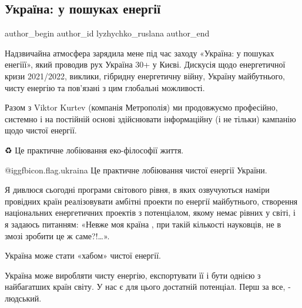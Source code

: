  
 
 
 
 
 
\subsection{Україна: у пошуках енергії}
\label{sec:27_01_2022.fb.lyzhychko_ruslana.1.ukraina_u_poshukah_energii}
 
\ifcmt
 author_begin
   author_id lyzhychko_ruslana
 author_end
\fi

Надзвичайна атмосфера зарядила мене під час заходу «Україна: у пошуках
енегіїї», який проводив рух Україна 30+ у Києві. Дискусія щодо енергетичної
кризи 2021/2022, виклики, гібридну енергетичну війну, Україну майбутнього,
чисту енергію та пов'язані з цим глобальні можливості. 


Разом з Viktor  Kurtev (компанія Метрополія) ми продовжуємо професійно,
системно і на постійній основі здійснювати інформаційну (і не тільки) кампанію
щодо чистої енергії.


♻️ Це практичне лобіювання еко-філософії життя. 

@igg{fbicon.flag.ukraina} Це практичне лобіювання чистої енергії України. 

Я дивлюся сьогодні програми світового рівня, в яких озвучуються наміри
провідних країн реалізовувати амбітні проекти по енергії майбутнього,
створення національних енергетичних проектів з потенціалом, якому немає рівних
у світі, і я задаюсь питанням:  «Невже моя країна , при такій кількості
науковців, не в змозі зробити це ж саме?!…». 

Україна може стати «хабом» чистої енергії.

Україна може виробляти чисту енергію, експортувати її і бути однією з
найбагатших країн світу. У нас є для цього достатній потенціал. Перш за все,  -
людський. 

